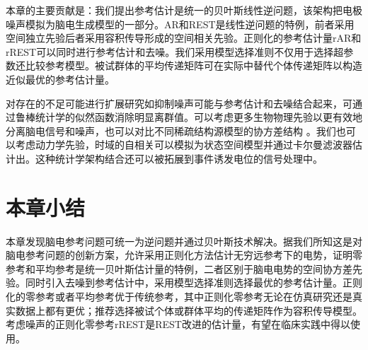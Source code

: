 本章的主要贡献是：我们提出参考估计是统一的贝叶斯线性逆问题，该架构把电极噪声模拟为脑电生成模型的一部分。AR和REST是线性逆问题的特例，前者采用空间独立先验后者采用容积传导形成的空间相关先验。正则化的参考估计量rAR和rREST可以同时进行参考估计和去噪。我们采用模型选择准则不仅用于选择超参数还比较参考模型。被试群体的平均传递矩阵可在实际中替代个体传递矩阵以构造近似最优的参考估计量。

对存在的不足可能进行扩展研究如抑制噪声可能与参考估计和去噪结合起来，可通过鲁棒统计学的似然函数消除明显离群值。可以考虑更多生物物理先验以更有效地分离脑电信号和噪声，也可以对比不同稀疏结构源模型的协方差结构
。我们也可以考虑动力学先验，时域的自相关可以模拟为状态空间模型并通过卡尔曼滤波器估计出。这种统计学架构结合还可以被拓展到事件诱发电位的信号处理中。

\section{本章小结}
本章发现脑电参考问题可统一为逆问题并通过贝叶斯技术解决。据我们所知这是对脑电参考问题的创新方案，允许采用正则化方法估计无穷远参考下的电势，证明零参考和平均参考是统一贝叶斯估计量的特例，二者区别于脑电电势的空间协方差先验。同时引入去噪到参考估计中，采用模型选择准则选择最优的参考估计量。正则化的零参考或者平均参考优于传统参考，其中正则化零参考无论在仿真研究还是真实数据上都有更优；推荐选择被试个体或群体平均的传递矩阵作为容积传导模型。考虑噪声的正则化零参考rREST是REST改进的估计量，有望在临床实践中得以使用。